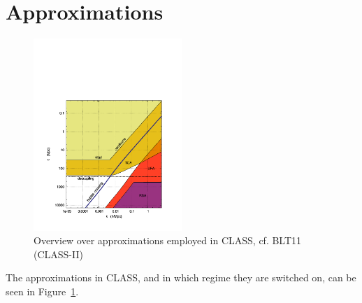 \documentclass[a4paper]{article}
\begin{document}
  

\section{Approximations}
\begin{figure}
  \centering
  \includegraphics[width=0.5\textwidth]{approx_summary.pdf}
  \caption{Overview over approximations employed in CLASS, cf. BLT11 (CLASS-II)}
  \label{fig:approx_overview}
\end{figure}

The approximations in CLASS, and in which regime they are switched on, can be seen in Figure~\ref{fig:approx_overview}.
\end{document}
